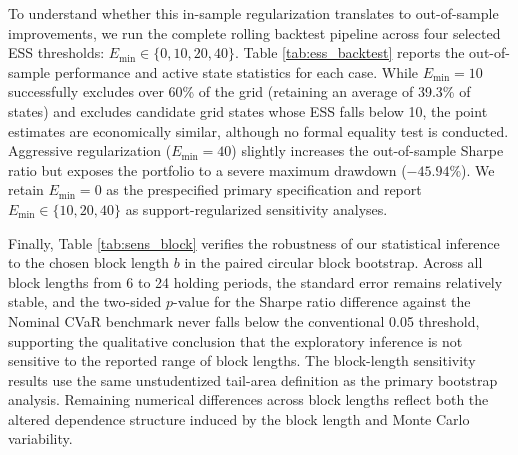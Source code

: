 \documentclass[11pt, a4paper]{article}
\begin{document}
To understand whether this in-sample regularization translates to out-of-sample improvements, we run the complete rolling backtest pipeline across four selected ESS thresholds: $E_{\min} \in \{0, 10, 20, 40\}$. Table \ref{tab:ess_backtest} reports the out-of-sample performance and active state statistics for each case. While $E_{\min}=10$ successfully excludes over 60\% of the grid (retaining an average of 39.3\% of states) and excludes candidate grid states whose ESS falls below 10, the point estimates are economically similar, although no formal equality test is conducted. Aggressive regularization ($E_{\min}=40$) slightly increases the out-of-sample Sharpe ratio but exposes the portfolio to a severe maximum drawdown ($-45.94\%$). We retain $E_{\min}=0$ as the prespecified primary specification and report $E_{\min}\in\{10,20,40\}$ as support-regularized sensitivity analyses.

\begin{table}[htbp]
\centering
\caption{Out-of-sample performance across ESS thresholds ($E_{\min}$)}
\label{tab:ess_backtest}
\end{table}

Finally, Table \ref{tab:sens_block} verifies the robustness of our statistical inference to the chosen block length $b$ in the paired circular block bootstrap. Across all block lengths from 6 to 24 holding periods, the standard error remains relatively stable, and the two-sided $p$-value for the Sharpe ratio difference against the Nominal CVaR benchmark never falls below the conventional 0.05 threshold, supporting the qualitative conclusion that the exploratory inference is not sensitive to the reported range of block lengths. The block-length sensitivity results use the same unstudentized tail-area definition as the primary bootstrap analysis. Remaining numerical differences across block lengths reflect both the altered dependence structure induced by the block length and Monte Carlo variability.
\end{document}
